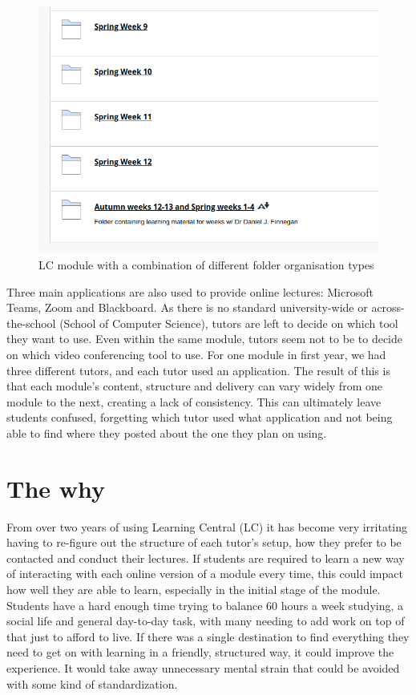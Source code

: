 \begin{figure}[H]
    \centering
    \includegraphics[scale=0.25]{images/LC screenshots/LC module with folders diff combo.png}
    \caption{LC module with a combination of different folder organisation types}
    \label{fig:my_label}
\end{figure} 

Three main applications are also used to provide online lectures: Microsoft Teams, Zoom and Blackboard. As there is no standard university-wide or across-the-school (School of Computer Science), tutors are left to decide on which tool they want to use. Even within the same module, tutors seem not to be to decide on which video conferencing tool to use. For one module in first year, we had three different tutors, and each tutor used an application. The result of this is that each module's content, structure and delivery can vary widely from one module to the next, creating a lack of consistency. This can ultimately leave students confused, forgetting which tutor used what application and not being able to find where they posted about the one they plan on using.

\section{The why}

From over two years of using Learning Central (LC) it has become very irritating having to re-figure out the structure of each tutor's setup, how they prefer to be contacted and conduct their lectures. If students are required to learn a new way of interacting with each online version of a module every time, this could impact how well they are able to learn, especially in the initial stage of the module. Students have a hard enough time trying to balance 60 hours a week studying, a social life and general day-to-day task, with many needing to add work on top of that just to afford to live. If there was a single destination to find everything they need to get on with learning in a friendly, structured way, it could improve the experience. It would take away unnecessary mental strain that could be avoided with some kind of standardization.

